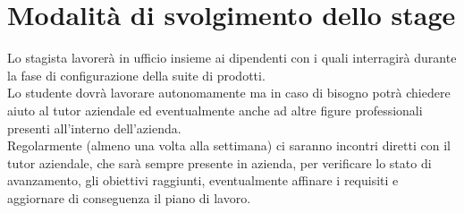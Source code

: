 
\section*{Modalità di svolgimento dello stage}
Lo stagista lavorerà in ufficio insieme ai dipendenti con i quali interragirà durante la fase di configurazione della suite di prodotti.\\
Lo studente dovrà lavorare autonomamente ma in caso di bisogno potrà chiedere aiuto al tutor aziendale ed eventualmente anche ad altre figure professionali presenti all'interno dell'azienda.\\
Regolarmente (almeno una volta alla settimana) ci saranno incontri diretti con il tutor aziendale, che sarà sempre presente in azienda, per verificare lo stato di avanzamento, gli obiettivi raggiunti, eventualmente affinare i requisiti e aggiornare di conseguenza il piano di lavoro.